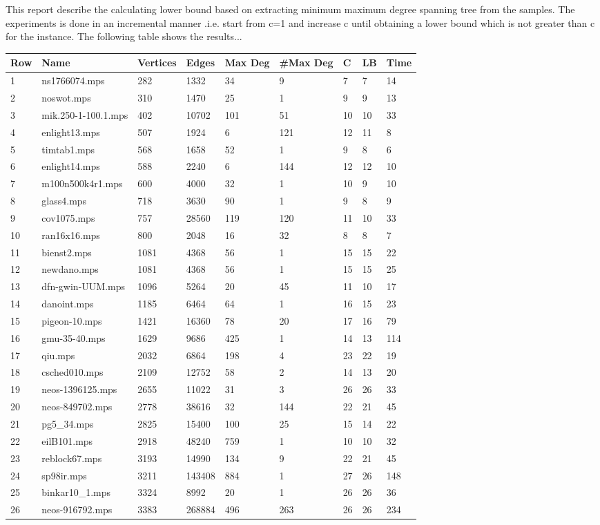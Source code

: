 \documentclass{article}
\begin{document}
This report describe the calculating lower bound based on extracting minimum maximum degree spanning tree from the samples. The experiments is done in an incremental manner .i.e. start from c=1 and increase c until obtaining a lower bound which is not greater than c for the instance. The following table shows the results...
\begin{longtable}{|l |l |l |l |l |l |l |l |l |}
\hline
Row&Name&Vertices&Edges&Max Deg&\#Max Deg&C&LB&Time\\
\hline
1&ns1766074.mps&282&1332&34&9&7&7&14\\
2&noswot.mps&310&1470&25&1&9&9&13\\
3&mik.250-1-100.1.mps&402&10702&101&51&10&10&33\\
4&enlight13.mps&507&1924&6&121&12&11&8\\
5&timtab1.mps&568&1658&52&1&9&8&6\\
6&enlight14.mps&588&2240&6&144&12&12&10\\
7&m100n500k4r1.mps&600&4000&32&1&10&9&10\\
8&glass4.mps&718&3630&90&1&9&8&9\\
9&cov1075.mps&757&28560&119&120&11&10&33\\
10&ran16x16.mps&800&2048&16&32&8&8&7\\
11&bienst2.mps&1081&4368&56&1&15&15&22\\
12&newdano.mps&1081&4368&56&1&15&15&25\\
13&dfn-gwin-UUM.mps&1096&5264&20&45&11&10&17\\
14&danoint.mps&1185&6464&64&1&16&15&23\\
15&pigeon-10.mps&1421&16360&78&20&17&16&79\\
16&gmu-35-40.mps&1629&9686&425&1&14&13&114\\
17&qiu.mps&2032&6864&198&4&23&22&19\\
18&csched010.mps&2109&12752&58&2&14&13&20\\
19&neos-1396125.mps&2655&11022&31&3&26&26&33\\
20&neos-849702.mps&2778&38616&32&144&22&21&45\\
21&pg5_34.mps&2825&15400&100&25&15&14&22\\
22&eilB101.mps&2918&48240&759&1&10&10&32\\
23&reblock67.mps&3193&14990&134&9&22&21&45\\
24&sp98ir.mps&3211&143408&884&1&27&26&148\\
25&binkar10_1.mps&3324&8992&20&1&26&26&36\\
26&neos-916792.mps&3383&268884&496&263&26&26&234\\

\end{longtable}
\end{document}
